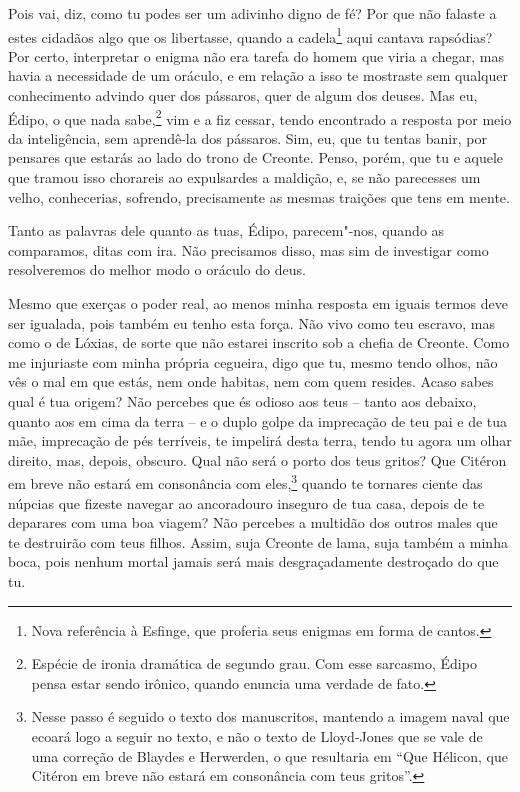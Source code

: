  Pois vai, diz, como tu podes ser um adivinho digno de fé? Por que
não falaste a estes cidadãos algo que os libertasse, quando a
cadela\footnote{Nova referência à Esfinge, que proferia seus enigmas em
  forma de cantos.} aqui cantava rapsódias? Por certo, interpretar o
enigma não era tarefa do homem que viria a chegar, mas havia a
necessidade de um oráculo, e em relação a isso te mostraste sem qualquer
conhecimento advindo quer dos pássaros, quer de algum dos deuses. Mas
eu, Édipo, o que nada sabe,\footnote{Espécie de ironia dramática de
  segundo grau. Com esse sarcasmo, Édipo pensa estar sendo irônico,
  quando enuncia uma verdade de fato.} vim e a fiz cessar,
tendo encontrado a resposta por meio da inteligência, sem aprendê-la dos
pássaros. Sim, eu, que tu tentas banir, por pensares que estarás ao lado
do trono de Creonte. Penso, porém, que tu e aquele que tramou isso
chorareis ao expulsardes a maldição, e, se não parecesses um velho,
conhecerias, sofrendo, precisamente as mesmas traições que tens em
mente.

   Tanto as palavras dele quanto as tuas, Édipo, parecem"-nos, quando as
comparamos, ditas com ira. Não precisamos disso, mas sim de investigar
como resolveremos do melhor modo o oráculo do deus.

   Mesmo que exerças o poder real, ao menos minha resposta em iguais termos
 deve ser igualada, pois também eu tenho esta força. Não vivo como
teu escravo, mas como o de Lóxias, de sorte que não estarei inscrito sob
a chefia de Creonte. Como me injuriaste com minha própria cegueira, digo
que tu, mesmo tendo olhos, não vês o mal em que estás, nem onde habitas,
nem com quem resides. Acaso sabes qual é tua origem? Não percebes que és
odioso aos teus -- tanto aos debaixo, quanto aos em cima da terra -- e o
duplo golpe da imprecação de teu pai e de tua mãe, imprecação de pés
terríveis, te impelirá desta terra, tendo tu agora um olhar direito,
mas, depois, obscuro. Qual não será o porto dos teus gritos? Que
Citéron em breve não estará em consonância com eles,\footnote{Nesse passo
  é seguido o texto dos manuscritos, mantendo a imagem naval que ecoará
  logo a seguir no texto, e não o texto de Lloyd-Jones que se vale de
  uma correção de Blaydes e Herwerden, o que resultaria em ``Que
  Hélicon, que Citéron em breve não estará em consonância com teus
  gritos''.} quando te tornares ciente das núpcias que fizeste navegar
ao ancoradouro inseguro de tua casa, depois de te deparares com uma boa
viagem? Não percebes a multidão dos outros males que te destruirão com
teus filhos. Assim, suja Creonte de lama, suja também a minha boca, pois
nenhum mortal jamais será mais desgraçadamente destroçado do que tu.

